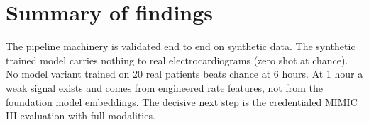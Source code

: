\documentclass[11pt]{article}
\begin{document}
\section{Summary of findings}
The pipeline machinery is validated end to end on synthetic data. The
synthetic trained model carries nothing to real electrocardiograms (zero shot
at chance). No model variant trained on 20 real patients beats chance at 6
hours. At 1 hour a weak signal exists and comes from engineered rate features,
not from the foundation model embeddings. The decisive next step is the
credentialed MIMIC III evaluation with full modalities.
\end{document}
